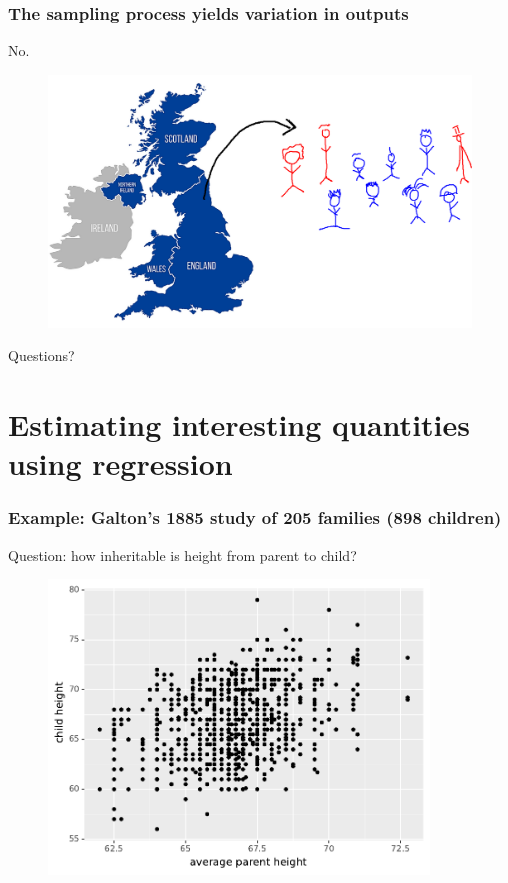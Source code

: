 \documentclass[handout]{beamer}
\begin{document}
\begin{frame}
	\frametitle{The sampling process yields variation in outputs}
	No.
	
	\begin{figure}[ht]
		\centerline{\includegraphics[width=1\textwidth]{../figures/uk-population.pdf}}
	\end{figure}
	
\end{frame}

\begin{frame}
	
	\Large Questions?
\end{frame}

\section{Estimating interesting quantities using regression}
\frame{\tableofcontents[currentsection]}

\begin{frame}
	\frametitle{Example: Galton's 1885 study of 205 families (898 children)}
	
	Question: how inheritable is height from parent to child?
	
		\begin{figure}[ht]
			\centerline{\includegraphics[width=0.9\textwidth]{../figures/galton_raw.pdf}}
		\end{figure}
	
\end{frame}
\end{document}
